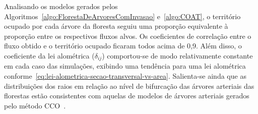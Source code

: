 Analisando os modelos gerados pelos Algoritmos~\ref{algo:FlorestaDeArvoresComInvasao} e~\ref{algo:COAT}, 
o território ocupado por cada árvore da floresta seguiu uma proporção equivalente à proporção entre os 
respectivos fluxos alvos. Os coeficientes de correlação entre o fluxo obtido e o território ocupado 
ficaram todos acima de 0,9. Além disso, o coeficiente da lei alométrica ($\delta_{ij}$) comportou-se 
de modo relativamente constante em cada caso das simulações, exibindo uma tendência para uma lei 
alométrica conforme~\eqref{eq:lei-alometrica-secao-transversal-vs-area}. 
Salienta-se ainda que as distribuições dos raios em relação ao nível de bifurcação das 
árvores arteriais das florestas estão consistentes com aquelas de modelos 
de árvores arteriais gerados pelo método CCO~\cite{Karch1999}.
